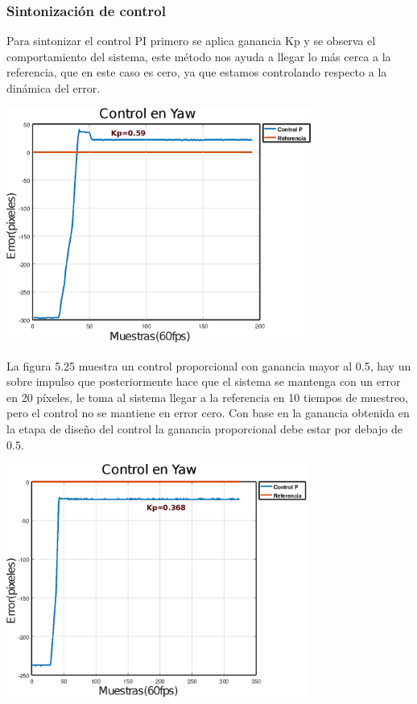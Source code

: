 \subsubsection{Sintonización de control}
Para sintonizar el control PI primero se aplica ganancia Kp y se observa el comportamiento del sistema, este
método nos ayuda a llegar lo más cerca a la referencia, que en este caso es cero, ya que estamos controlando
respecto a la dinámica del error.
\begin{center}
	\includegraphics[width=0.75\textwidth]{Contenido/Cuerpo/Capitulo5/Fig30.eps}
	\label{Fig4}
\end{center}
La figura 5.25 muestra un control proporcional con ganancia mayor al 0.5, hay un sobre impulso que posteriormente
hace que el sistema se mantenga con un error en 20 píxeles, le toma al sistema llegar a la referencia en 10 tiempos de
muestreo, pero el control no se mantiene en error cero. Con base en la ganancia obtenida en la etapa de diseño del control la ganancia proporcional debe estar por debajo de 0.5.
\begin{center}
	\includegraphics[width=0.74\textwidth]{Contenido/Cuerpo/Capitulo5/Fig31.eps}
	\label{Fig4}
\end{center}
